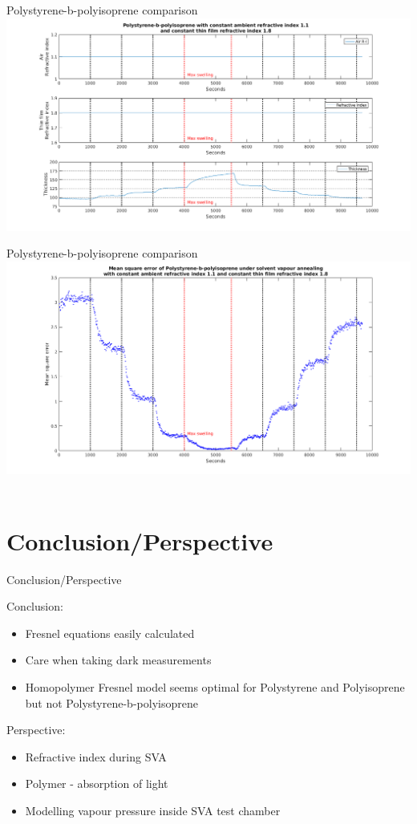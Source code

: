 \documentclass[10pt]{beamer}
\begin{document}
\begin{frame}{Polystyrene-b-polyisoprene comparison}
	\centering
	\includegraphics[width=\textwidth]{PSPIn11n18AVG1.png}
\end{frame}

\begin{frame}{Polystyrene-b-polyisoprene comparison}
	\centering
	\includegraphics[width=\textwidth]{PSPIn11n18AVG2.png}\
\end{frame}

	\section{Conclusion/Perspective}
	
\begin{frame}{Conclusion/Perspective}

Conclusion:
\begin{itemize}
\item Fresnel equations easily calculated
\item Care when taking dark measurements
\item Homopolymer Fresnel model seems optimal for Polystyrene and Polyisoprene but not Polystyrene-b-polyisoprene  
\end{itemize}
Perspective:
\begin{itemize}
\item Refractive index during SVA
\item Polymer - absorption of light
\item Modelling vapour pressure inside SVA test chamber
\end{itemize}

\end{frame}
\end{document}
